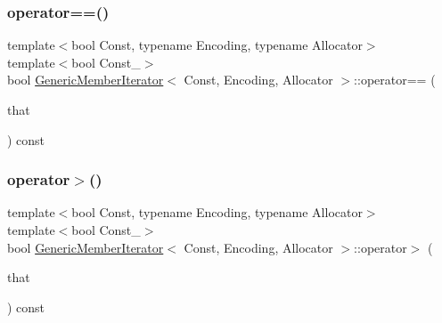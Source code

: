 \subsubsection{\texorpdfstring{operator==()}{operator==()}}
{\footnotesize\ttfamily template$<$bool Const, typename Encoding, typename Allocator$>$ \\
template$<$bool Const\+\_\+$>$ \\
bool \hyperlink{classGenericMemberIterator}{Generic\+Member\+Iterator}$<$ Const, Encoding, Allocator $>$\+::operator== (\begin{DoxyParamCaption}\item[{const \hyperlink{classGenericMemberIterator}{Generic\+Member\+Iterator}$<$ Const\+\_\+, Encoding, Allocator $>$ \&}]{that }\end{DoxyParamCaption}) const\hspace{0.3cm}{\ttfamily [inline]}}

\mbox{\label{classGenericMemberIterator_a1b2faefeb0d9bbc04bd02d69d25828f5}} 
\subsubsection{\texorpdfstring{operator$>$()}{operator>()}}
{\footnotesize\ttfamily template$<$bool Const, typename Encoding, typename Allocator$>$ \\
template$<$bool Const\+\_\+$>$ \\
bool \hyperlink{classGenericMemberIterator}{Generic\+Member\+Iterator}$<$ Const, Encoding, Allocator $>$\+::operator$>$ (\begin{DoxyParamCaption}\item[{const \hyperlink{classGenericMemberIterator}{Generic\+Member\+Iterator}$<$ Const\+\_\+, Encoding, Allocator $>$ \&}]{that }\end{DoxyParamCaption}) const\hspace{0.3cm}{\ttfamily [inline]}}

\mbox{\label{classGenericMemberIterator_ab6d9e8fce04a598f10453b3f722c78ac}} 

